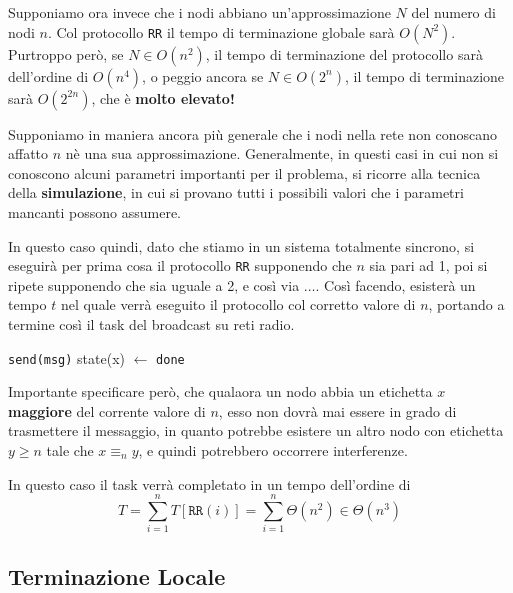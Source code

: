 Supponiamo ora invece che i nodi abbiano un'approssimazione $N$ del numero di nodi $n$. Col protocollo \texttt{RR} il tempo di terminazione globale sarà $O(N^2)$. Purtroppo però, se $N \in O(n^2)$, il tempo di terminazione del protocollo sarà dell'ordine di $O(n^4)$, o peggio ancora se $N \in O(2^n)$, il tempo di terminazione sarà $O(2^{2n})$, che è \textbf{molto elevato!}

Supponiamo in maniera ancora più generale che i nodi nella rete non conoscano affatto $n$ nè una sua approssimazione. Generalmente, in questi casi in cui non si conoscono alcuni parametri importanti per il problema, si ricorre alla tecnica della \textbf{simulazione}, in cui si provano tutti i possibili valori che i parametri mancanti possono assumere.

In questo caso quindi, dato che stiamo in un sistema totalmente sincrono, si eseguirà per prima cosa il protocollo \texttt{RR} supponendo che $n$ sia pari ad 1, poi si ripete supponendo che sia uguale a 2, e così via $\dots$. Così facendo, esisterà un tempo $t$ nel quale verrà eseguito il protocollo col corretto valore di $n$, portando a termine così il task del broadcast su reti radio.

\begin{algorithm}
\caption{Generalized Round-Robin Protocol}
\begin{algorithmic}[1]
                \State \texttt{send(msg)}
                \State state(x) $\gets$ \texttt{done}
            \EndIf
        \EndFor
    \EndFor
\EndFor
\end{algorithmic}
\end{algorithm}

Importante specificare però, che qualaora un nodo abbia un etichetta $x$ \textbf{maggiore} del corrente valore di $n$, esso non dovrà mai essere in grado di trasmettere il messaggio, in quanto potrebbe esistere un altro nodo con etichetta $y \geq n$ tale che $x \equiv_{n} y$, e quindi potrebbero occorrere interferenze.

In questo caso il task verrà completato in un tempo dell'ordine di
\[
    T = \sum_{i=1}^{n}T[\texttt{RR}(i)] = \sum_{i = 1}^{n} \Theta(n^2) \in \Theta(n^3)
\]

\subsection{Terminazione Locale}

